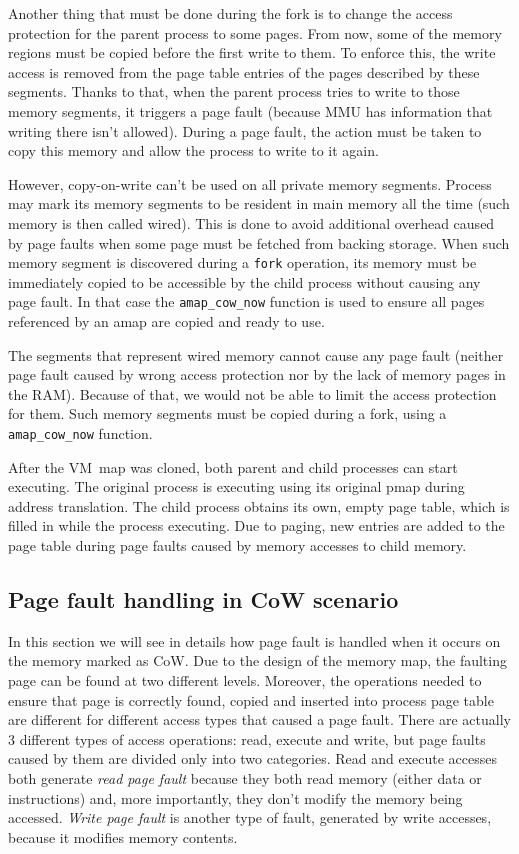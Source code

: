 Another thing that must be done during the fork is to change the access protection for the parent process to some pages.
From now, some of the memory regions must be copied before the first write to them.
To enforce this, the write access is removed from the page table entries of the pages described by these segments.
Thanks to that, when the parent process tries to write to those memory segments, it triggers a page fault
(because MMU has information that writing there isn't allowed).
During a page fault, the action must be taken to copy this memory and allow the process to write to it again.

However, copy-on-write can't be used on all private memory segments.
Process may mark its memory segments to be resident in main memory all the time (such memory is then called wired).
This is done to avoid additional overhead caused by page faults when some page must be fetched from backing storage.
When such memory segment is discovered during a {\tt fork} operation, its memory must be immediately copied to be accessible by the child process
without causing any page fault.
In that case the \texttt{amap_cow_now} function is used to ensure all pages referenced by an amap are copied and ready to use.

The segments that represent wired memory cannot cause any page fault
(neither page fault caused by wrong access protection nor by the lack of memory pages in the RAM).
Because of that, we would not be able to limit the access protection for them.
Such memory segments must be copied during a fork, using a \texttt{amap_cow_now} function.

After the VM~map was cloned, both parent and child processes can start executing.
The original process is executing using its original pmap during address translation.
The child process obtains its own, empty page table, which is filled in while the process executing.
Due to paging, new entries are added to the page table during page faults caused by memory accesses to child memory.

\subsection{Page fault handling in CoW scenario}

In this section we will see in details how page fault is handled when it occurs on the memory marked as CoW.
Due to the design of the memory map, the faulting page can be found at two different levels.
Moreover, the operations needed to ensure that page is correctly found, copied and inserted into process page table are different
for different access types that caused a page fault.
There are actually 3 different types of access operations: read, execute and write, but page faults caused by them are divided only into two categories.
Read and execute accesses both generate {\it read page fault} because they both read memory (either data or instructions) and,
more importantly, they don't modify the memory being accessed.
{\it Write page fault} is another type of fault, generated by write accesses, because it modifies memory contents.

